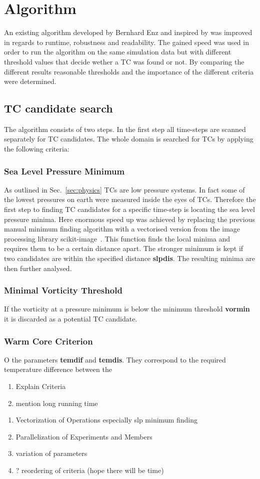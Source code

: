 \section{Algorithm}
An existing algorithm developed by Bernhard Enz and inspired by \cite{orig-tracking} was improved in regards to runtime, robustness and readability. The gained speed was used in order to run the algorithm on the same simulation data but with different threshold values that decide wether a TC was found or not. By comparing the different results reasonable thresholds and the importance of the different criteria were determined.
\subsection{TC candidate search}
The algorithm consists of two steps. In the first step all time-steps are scanned separately for TC candidates. The whole domain is searched for TCs by applying the following criteria:
\subsubsection*{Sea Level Pressure Minimum}
As outlined in Sec.~\ref{sec:physics} TCs are low pressure systems. In fact some of the lowest pressures on earth were measured inside the eyes of TCs. Therefore the first step to finding TC candidates for a specific time-step is locating the sea level pressure minima. Here enormous speed up was achieved by replacing the previous manual minimum finding algorithm with a vectorised version from the image processing library scikit-image~\cite{scikit-image}. This function finds the local minima and requires them to be a certain distance apart. The stronger minimum is kept if two candidates are within the specified distance \textbf{slpdis}. The resulting minima are then further analysed.
\subsubsection*{Minimal Vorticity Threshold}
If the vorticity at a pressure minimum is below the minimum threshold \textbf{vormin} it is discarded as a potential TC candidate. 
\subsubsection*{Warm Core Criterion}
O
 the parameters \textbf{temdif} and \textbf{temdis}. They correspond to the required temperature difference between the 

\begin{enumerate}
    \item Explain Criteria
    \item mention long running time
\end{enumerate}
\begin{enumerate}
    \item Vectorization of Operations especially slp minimum finding
    \item Parallelization of Experiments and Members
    \item variation of parameters
    \item ? reordering of criteria (hope there will be time)
\end{enumerate}
